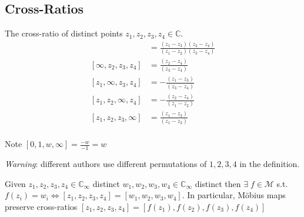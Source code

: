 \subsection{Cross-Ratios}

\begin{definition} \label{def:23}
    The cross-ratio of distinct points $z_1, z_2, z_3, z_4 \in \mathbb{C}$.
    \begin{align*}
        [z_1, z_2, z_3, z_4] &= \frac{(z_1 - z_3)(z_2 - z_4)}{(z_1 - z_2)(z_3 - z_4)} \\
        [\infty, z_2, z_3, z_4] &= \frac{(z_2 - z_4)}{(z_3 - z_4)} \\
        [z_1, \infty, z_3, z_4] &= -\frac{(z_1 - z_3)}{(z_3 - z_4)} \\
        [z_1, z_2, \infty, z_4] &= -\frac{(z_2 - z_4)}{(z_1 - z_2)} \\
        [z_1, z_2, z_3, \infty] &= \frac{(z_1 - z_3)}{(z_1 - z_2)} \\
    \end{align*} 
\end{definition} 

Note $[0, 1, w, \infty] = \frac{-w}{-1} = w$

\emph{Warning}: different authors use different permutations of $1, 2, 3, 4$ in the definition.

\begin{theorem} \label{thm:19}
    Given $z_1, z_2, z_3, z_4 \in \mathbb{C}_\infty$ distinct $w_1, w_2, w_3, w_4 \in \mathbb{C}_\infty$ distinct then $\exists \; f \in \mathcal{M}$ s.t. $f(z_i) = w_i \iff [z_1, z_2, z_3, z_4] = [w_1, w_2, w_3, w_4]$.
    In particular, M\"obius maps preserve cross-ratios $[z_1, z_2, z_3, z_4] = [f(z_1), f(z_2), f(z_3), f(z_4)]$
\end{theorem} 

